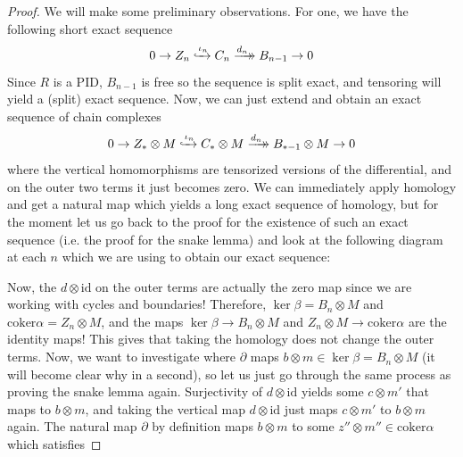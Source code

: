 \documentclass[12pt,reqno]{amsart}
\numberwithin{theorem}{section}
\theoremstyle{definition}
\theoremstyle{remark}
\numberwithin{equation}{section}
\newcommand{\del}{\partial}
\theoremstyle{definition}
\newcommand{\id}{\mathrm{id}}
\newcommand{\coker}{\mathrm{coker}}
\newcommand{\xmono}[1]{\xhookrightarrow{#1}}
\newcommand{\xepi}[2][]{\xrightarrow[#1]{#2}\mathrel{\mkern-14mu}\rightarrow}
\begin{document}
\begin{proof}
    We will make some preliminary observations. For one, we have the following short exact sequence
    $$0 \rightarrow Z_n \xmono{\iota_n} C_n\xepi[]{d_n} B_{n-1} \rightarrow 0$$
    Since $R$ is a PID, $B_{n-1}$ is free so the sequence is split exact, and tensoring will yield a (split) exact sequence. Now, we can just extend and obtain an exact sequence of chain complexes
    $$0 \rightarrow Z_*\otimes M \xmono{\iota_n} C_*\otimes M \xepi[]{d_n} B_{*-1} \otimes M \rightarrow 0$$
    where the vertical homomorphisms are tensorized versions of the differential, and on the outer two terms it just becomes zero.
    We can immediately apply homology and get a natural map which yields a long exact sequence of homology, but for the moment let us go back to the proof for the existence of such an exact sequence (i.e. the proof for the snake lemma) and look at the following diagram at each $n$ which we are using to obtain our exact sequence:
    \begin{center}
    \end{center}
    Now, the $d \otimes \id$ on the outer terms are actually the zero map since we are working with cycles and boundaries! Therefore, $\ker \beta = B_n \otimes M$ and $\coker \alpha = Z_n\otimes M$, and the maps $\ker \beta \rightarrow B_n\otimes M$ and $Z_n\otimes M \rightarrow \coker \alpha$ are the identity maps! This gives that taking the homology does not change the outer terms. Now, we want to investigate where $\del$ maps $b\otimes m \in \ker \beta =B_n \otimes M$ (it will become clear why in a second), so let us just go through the same process as proving the snake lemma again. Surjectivity of $d\otimes \id$ yields some $c\otimes m'$ that maps to $b\otimes m$, and taking the vertical map $d\otimes \id$ just maps $c\otimes m'$ to $b \otimes m$ again. The natural map $\del$ by definition maps $b\otimes m$ to some $z'' \otimes m'' \in \coker \alpha$ which satisfies  

\end{proof}
\end{document}
